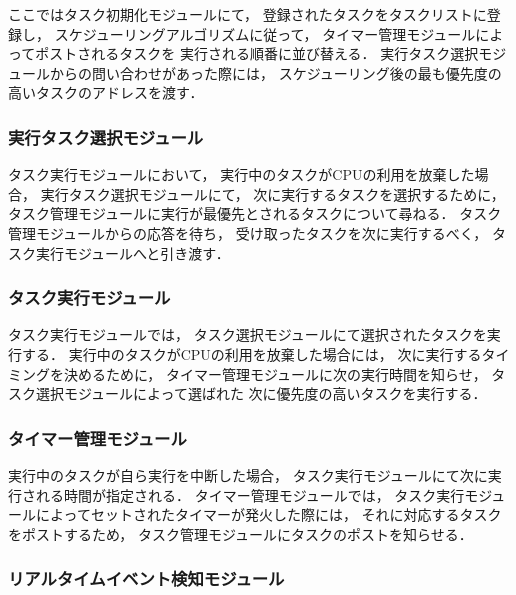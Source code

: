 \vspace{0.5em}ここではタスク初期化モジュールにて，
登録されたタスクをタスクリストに登録し，
スケジューリングアルゴリズムに従って，
タイマー管理モジュールによってポストされるタスクを
実行される順番に並び替える．
実行タスク選択モジュールからの問い合わせがあった際には，
スケジューリング後の最も優先度の高いタスクのアドレスを渡す．



\subsubsection{実行タスク選択モジュール}

\vspace{0.5em}タスク実行モジュールにおいて，
実行中のタスクがCPUの利用を放棄した場合，
実行タスク選択モジュールにて，
次に実行するタスクを選択するために，
タスク管理モジュールに実行が最優先とされるタスクについて尋ねる．
タスク管理モジュールからの応答を待ち，
受け取ったタスクを次に実行するべく，
タスク実行モジュールへと引き渡す．



\subsubsection{タスク実行モジュール}

\vspace{0.5em}タスク実行モジュールでは，
タスク選択モジュールにて選択されたタスクを実行する．
実行中のタスクがCPUの利用を放棄した場合には，
次に実行するタイミングを決めるために，
タイマー管理モジュールに次の実行時間を知らせ，
タスク選択モジュールによって選ばれた
次に優先度の高いタスクを実行する．



\subsubsection{タイマー管理モジュール}

\vspace{0.5em}実行中のタスクが自ら実行を中断した場合，
タスク実行モジュールにて次に実行される時間が指定される．
タイマー管理モジュールでは，
タスク実行モジュールによってセットされたタイマーが発火した際には，
それに対応するタスクをポストするため，
タスク管理モジュールにタスクのポストを知らせる．


\subsubsection{リアルタイムイベント検知モジュール}

